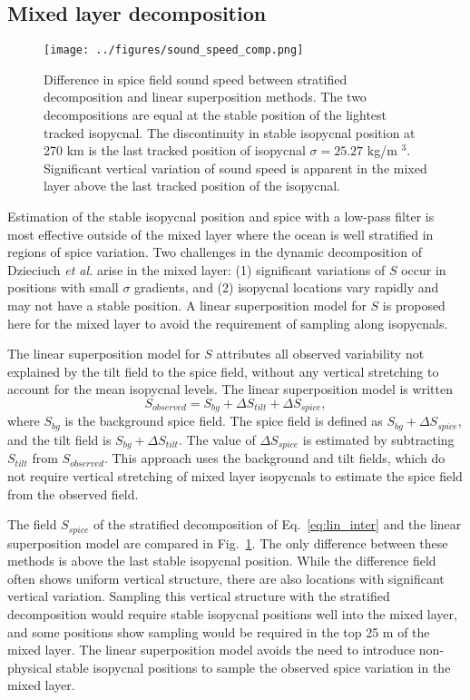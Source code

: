 \documentclass[preprint,NumberedRefs]{JASA}
\begin{document}
\subsection{Mixed layer decomposition}\label{ssec:ml_decomp}
\begin{figure}
\texttt{[image: ../figures/sound\_speed\_comp.png]}
    \caption{\label{fig:c_diff}{Difference in spice field sound speed between stratified decomposition and linear superposition methods. The two decompositions are equal at the stable position of the lightest tracked isopycnal. The discontinuity in stable isopycnal position at 270 km is the last tracked position of isopycnal $\sigma=25.27$ kg/m $^3$. Significant vertical variation of sound speed is apparent in the mixed layer above the last tracked position of the isopycnal.}}
\end{figure}

Estimation of the stable isopycnal position and spice with a low-pass filter is most effective outside of the mixed layer where the ocean is well stratified in regions of spice variation. Two challenges in the dynamic decomposition of Dzieciuch \emph{et al.}\citep{dzieciuch2004} arise in the mixed layer: (1) significant variations of $S$ occur in positions with small $\sigma$ gradients, and (2) isopycnal locations vary rapidly and may not have a stable position. A linear superposition model for $S$ is proposed here for the mixed layer to avoid the requirement of sampling along isopycnals.

The linear superposition model for $S$ attributes all observed variability not explained by the tilt field to the spice field, without any vertical stretching to account for the mean isopycnal levels. The linear superposition model is written
\begin{equation}
    S_{observed} = S_{bg} + \Delta S_{tilt} + \Delta S_{spice},
    \label{eq:lin_sup}
\end{equation}
where $S_{bg}$ is the background spice field. The spice field is defined as $S_{bg} + \Delta S_{spice}$, and the tilt field is $S_{bg} + \Delta S_{tilt}$. The value of $\Delta S_{spice}$ is estimated by subtracting $S_{tilt}$ from $S_{observed}$. This approach uses the background and tilt fields, which do not require vertical stretching of mixed layer isopycnals to estimate the spice field from the observed field.

The field $S_{spice}$ of the stratified decomposition of Eq.~\eqref{eq:lin_inter} and the linear superposition model are compared in Fig.~\ref{fig:c_diff}. The only difference between these methods is above the last stable isopycnal position. While the difference field often shows uniform vertical structure, there are also locations with significant vertical variation. Sampling this vertical structure with the stratified decomposition would require stable isopycnal positions well into the mixed layer, and some positions show sampling would be required in the top 25 m of the mixed layer. The linear superposition model avoids the need to introduce non-physical stable isopycnal positions to sample the observed spice variation in the mixed layer.
\end{document}
